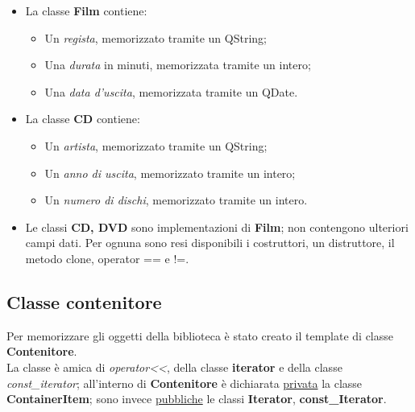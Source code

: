 {{\begin{itemize}
\begin{itemize}
					\item Un \textit{autore}, memorizzato tramite un QString;
					\item Un \textit{anno di uscita}, memorizzato tramite un intero;
					\item Un \textit{editore}, memorizzato tramite un QString.
				\end{itemize}
				\item La classe \textbf{Film} contiene:
				\begin{itemize}\itemsep=0.5pt
					\item Un \textit{regista}, memorizzato tramite un QString;
					\item Una \textit{durata} in minuti, memorizzata tramite un intero;
					\item Una \textit{data d'uscita}, memorizzata tramite un QDate.
				\end{itemize}
				\item La classe \textbf{CD}  contiene:
				\begin{itemize}\itemsep=0.5pt
					\item Un \textit{artista}, memorizzato tramite un QString;
					\item Un \textit{anno di uscita}, memorizzato tramite un intero;
					\item Un \textit{numero di dischi}, memorizzato tramite un intero.
				\end{itemize}
				\item Le classi \textbf{CD, DVD} sono implementazioni di \textbf{Film}; non contengono ulteriori campi dati. Per ognuna sono resi disponibili i costruttori, un distruttore, il metodo clone, operator == e !=.
			\end{itemize}
		}
		\subsection{Classe contenitore}{
			Per memorizzare gli oggetti della biblioteca è stato creato il template di classe \textbf{Contenitore}. \\
			La classe è amica di \textit{operator<<}, della classe \textbf{iterator} e della classe \textit{const\_iterator}; all'interno di \textbf{Contenitore} è dichiarata \underline{privata} la classe \textbf{ContainerItem}; sono invece \underline{pubbliche} le classi \textbf{Iterator}, \textbf{const\_Iterator}.\\
}}
